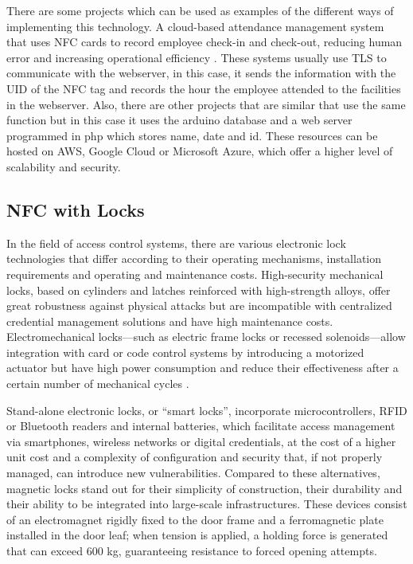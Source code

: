 There are some projects which can be used as examples of the different ways of implementing this technology. A cloud-based attendance management system that uses NFC cards to record employee check-in and check-out, reducing human error and increasing operational efficiency \cite{ref36}. These systems usually use TLS to communicate with the webserver, in this case, it sends the information with the UID of the NFC tag and records the hour the employee attended to the facilities in the webserver. Also, there are other projects that are similar \cite{ref37} that use the same function but in this case it uses the arduino database and a web server programmed in php which stores name, date and id. These resources can be hosted on AWS, Google Cloud or Microsoft Azure, which offer a higher level of scalability and security.

\subsection{NFC with Locks}

In the field of access control systems, there are various electronic lock technologies that differ according to their operating mechanisms, installation requirements and operating and maintenance costs. High-security mechanical locks, based on cylinders and latches reinforced with high-strength alloys, offer great robustness against physical attacks but are incompatible with centralized credential management solutions and have high maintenance costs. Electromechanical locks—such as electric frame locks or recessed solenoids—allow integration with card or code control systems by introducing a motorized actuator but have high power consumption and reduce their effectiveness after a certain number of mechanical cycles \cite{ref38}.

Stand-alone electronic locks, or ``smart locks'', incorporate microcontrollers, RFID or Bluetooth readers and internal batteries, which facilitate access management via smartphones, wireless networks or digital credentials, at the cost of a higher unit cost and a complexity of configuration and security that, if not properly managed, can introduce new vulnerabilities. Compared to these alternatives, magnetic locks stand out for their simplicity of construction, their durability and their ability to be integrated into large-scale infrastructures. These devices consist of an electromagnet rigidly fixed to the door frame and a ferromagnetic plate installed in the door leaf; when tension is applied, a holding force is generated that can exceed 600 kg, guaranteeing resistance to forced opening attempts.

